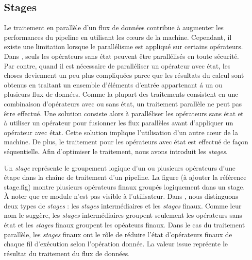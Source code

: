\subsection{Stages}


Le traitement en parall\`ele d'un flux de donn\'ees contribue \`a augmenter les performances du pipeline en utilisant les cœurs de la machine. Cependant, il existe une limitation lorsque le parall\'elisme est appliqu\'e sur certains op\'erateurs. Dans \PpFf, seuls les op\'erateurs sans \'etat peuvent \^etre parall\'elis\'es en toute s\'ecurit\'e. Par contre, quand il est n\'ecessaire de parall\'eliser un op\'erateur avec \'etat, les choses deviennent un peu plus compliqu\'ees parce que les r\'esultats du calcul sont obtenus en traitant un ensemble d'\'el\'ements d'entrée appartenant \'a un ou plusieurs flux de donn\'ees. Comme la plupart des traitements consistent en une combinaison d'op\'erateurs avec ou sans \'etat, un traitement parall\`ele ne peut pas \^etre effectu\'e. Une solution consiste alors \`a parall\'eliser les op\'erateurs sans \'etat et \`a utiliser un op\'erateur  pour fusionner les flux parall\`eles avant d'appliquer un op\'erateur avec \'etat. Cette solution implique l'utilisation d'un autre cœur de la machine. De plus, le traitement pour les op\'erateurs avec \'etat est effectu\'e de fa\c{c}on s\'equentielle. Afin d'optimiser le traitement, nous avons introduit les \emph{stages}.

Un \emph{stage} repr\'esente le groupement logique d'un ou plusieurs op\'erateurs d'une \'etape dans la cha\^ine de traitement d'un pipeline. La figure (\`a ajouter la r\'ef\'erence stage.fig) montre plusieurs op\'erateurs finaux group\'es logiquement dans un stage.  \`A noter que ce module n'est pas visible \`a l'utilisateur. Dans , nous distinguons deux types de \emph{stages} : les \emph{stages} interm\'ediaires et les \emph{stages} finaux. Comme leur nom le sugg\`ere, les \emph{stages} interm\'ediaires groupent seulement les op\'erateurs sans \'etat et les \emph{stages} finaux groupent les op\'eateurs finaux. Dans le cas du traitement parall\`ele, les \emph{stages} finaux ont le r\^ole de r\'eduire l'\'etat d'op\'erateurs finaux de chaque fil d'ex\'ecution selon l'op\'eration donn\'ee. La valeur issue repr\'eente le r\'esultat du traitement du flux de donn\'ees.



